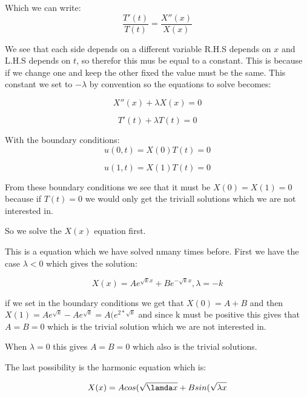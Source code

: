 \documentclass[a4paper,10pt]{article}
\begin{document}
Which we can write:
\begin{equation}
 \frac{T'(t)}{T(t)} = \frac{X''(x)}{X(x)}
\end{equation}

We see that each side depends on a different variable R.H.S depends on $x$ and L.H.S depends on $t$, so therefor this mus be equal to a constant.
This is because if we change one and keep the other fixed the value must be the same. This constant we set to $-\lambda$ by convention so the equations
to solve becomes:

\begin{equation}
 X''(x) + \lambda X(x) = 0
\end{equation}

\begin{equation}
 T'(t) + \lambda T(t) = 0
\end{equation}

With the boundary conditions:
\begin{equation}
 u(0,t) = X(0)T(t) = 0
\end{equation}

\begin{equation}
 u(1,t) = X(1)T(t) = 0
\end{equation}

From these boundary conditions we see that it must be $X(0) = X(1) = 0$ because if $T(t)=0$ we would only get the triviall solutions which we are not interested in.

So we solve the $X(x)$ equation first.

This is a equation which we have solved nmany times before. First we have the case $\lambda < 0$ which gives the solution:

\begin{equation}
 X(x) = Ae^{\sqrt{k}x} + Be^{-\sqrt{k}x}, \lambda=-k
\end{equation}

if we set in the boundary conditions we get that $X(0) = A+B$ and then $X(1) = Ae^{\sqrt{k}} - Ae^{\sqrt{k}} = A(e^{2*\sqrt{k}}$ and since k must
be positive this gives that $A=B=0$ which is the trivial solution which we are not interested in.

When $\lambda = 0 $ this gives $A=B=0$ which also is the trivial solutions.

The last possibility is the harmonic equation which is:

\begin{equation}

 X(x) = Acos(\sqrt{\lamda x} + Bsin(\sqrt{\lambda x}
\end{equation}
\end{document}
